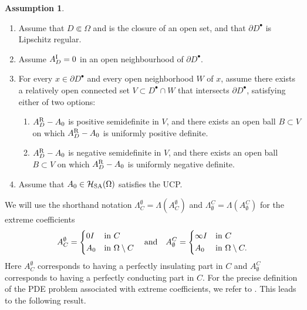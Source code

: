 \documentclass[reqno]{amsart}
\numberwithin{equation}{section}
\numberwithin{figure}{section}
\numberwithin{table}{section}
\theoremstyle{plain}
\theoremstyle{definition}
\newtheorem{assumption}[theorem]{Assumption}
\theoremstyle{remark}
\newcommand{\upR}{^{\textup{R}}}
\newcommand{\upI}{^{\textup{I}}}
\newcommand{\AR}{A\upR}
\newcommand{\AI}{A\upI}
\newcommand{\Hsa}{\mathcal{H}_{\textup{SA}}}
\begin{document}
	\begin{assumption}  \label{assump:reconextreme}  {}\
		\begin{enumerate}[\rm(i)]
			\item Assume that $D\Subset \Omega$ and is the closure of an open set, and that $\partial D^\bullet$ is Lipschitz regular.
			\item Assume $\AI_D = 0$ in an open neighbourhood of $\partial D^\bullet$.
			\item For every $x\in\partial D^\bullet$ and every open neighborhood $W$ of $x$, assume there exists a relatively open connected set $V\subset D^\bullet\cap W$ that intersects $\partial D^\bullet$, satisfying either of two options:
			\begin{enumerate}[\rm(a)]
				\item $\AR_D - A_0$ is positive semidefinite in $V$, and there exists an open ball $B\subset V$ on which $\AR_D - A_0$ is uniformly positive definite.
				\item $\AR_D - A_0$ is negative semidefinite in $V$, and there exists an open ball $B\subset V$ on which $\AR_D - A_0$ is uniformly negative definite.
			\end{enumerate}
			\item Assume that $A_0\in\Hsa(\Omega)$ satisfies the UCP.
		\end{enumerate}
	\end{assumption}
	
	We will use the shorthand notation $\Lambda_C^{\emptyset} = \Lambda(A_C^{\emptyset})$ and $\Lambda_{\emptyset}^C = \Lambda(A_{\emptyset}^C)$ for the extreme coefficients
	\begin{equation*}
		A_C^{\emptyset} = \begin{dcases}
			0 I & \text{in } C \\
			A_0 & \text{in } \Omega\setminus C
		\end{dcases}
		\quad 
		\text{and}
		\quad
		A_{\emptyset}^C = \begin{dcases}
			\infty I & \text{in } C \\
			A_0 & \text{in } \Omega\setminus C.
		\end{dcases}
	\end{equation*}
	Here $A_C^\emptyset$ corresponds to having a perfectly insulating part in $C$ and $A_\emptyset^C$ corresponds to having a perfectly conducting part in $C$. For the precise definition of the PDE problem associated with extreme coefficients, we refer to \cite[section 11]{GJZ2025}. This leads to the following result.
		
\end{document}
